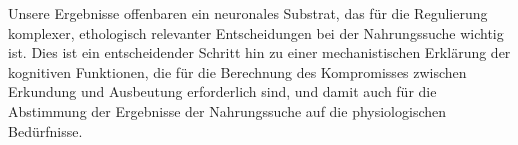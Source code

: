 \indent Unsere Ergebnisse offenbaren ein neuronales Substrat, das für die Regulierung komplexer, ethologisch relevanter Entscheidungen bei der Nahrungssuche wichtig ist. Dies ist ein entscheidender Schritt hin zu einer mechanistischen Erklärung der kognitiven Funktionen, die für die Berechnung des Kompromisses zwischen Erkundung und Ausbeutung erforderlich sind, und damit auch für die Abstimmung der Ergebnisse der Nahrungssuche auf die physiologischen Bedürfnisse.

